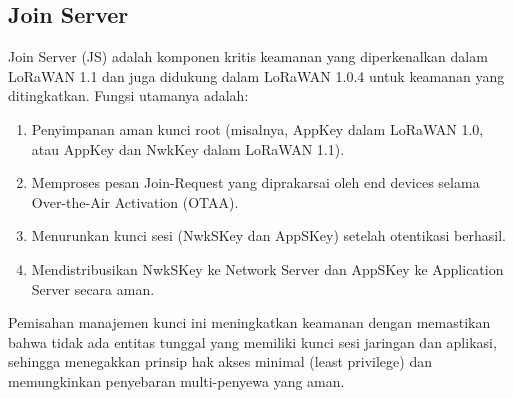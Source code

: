 \subsection{Join Server}
Join Server (JS) adalah komponen kritis keamanan yang diperkenalkan dalam LoRaWAN 1.1 dan juga didukung dalam LoRaWAN 1.0.4 untuk keamanan yang ditingkatkan. Fungsi utamanya adalah:
\begin{enumerate}
    \item Penyimpanan aman kunci root (misalnya, AppKey dalam LoRaWAN 1.0, atau AppKey dan NwkKey dalam LoRaWAN 1.1).
    \item Memproses pesan Join-Request yang diprakarsai oleh end devices selama Over-the-Air Activation (OTAA).
    \item Menurunkan kunci sesi (NwkSKey dan AppSKey) setelah otentikasi berhasil.
    \item Mendistribusikan NwkSKey ke Network Server dan AppSKey ke Application Server secara aman.
\end{enumerate}
Pemisahan manajemen kunci ini meningkatkan keamanan dengan memastikan bahwa tidak ada entitas tunggal yang memiliki kunci sesi jaringan dan aplikasi, sehingga menegakkan prinsip hak akses minimal (least privilege) dan memungkinkan penyebaran multi-penyewa yang aman.
